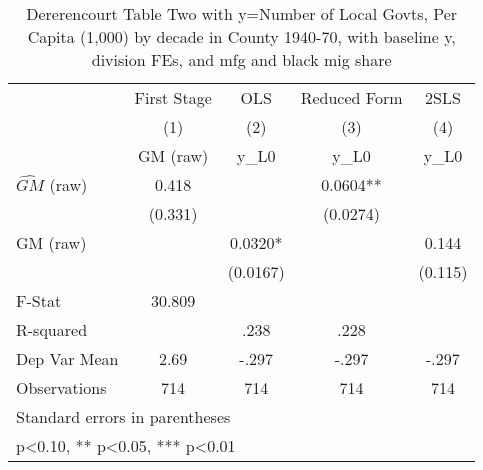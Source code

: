 \begin{table}[htbp]\centering
\def\sym#1{\ifmmode^{#1}\else\(^{#1}\)\fi}
\caption{Dererencourt Table Two with y=Number of Local Govts, Per Capita (1,000) by decade in County 1940-70, with baseline y, division FEs, and mfg and black mig share}
\begin{tabular}{l*{4}{c}}
\toprule
                    & First Stage   &         OLS   &Reduced Form   &        2SLS   \\
                    &\multicolumn{1}{c}{(1)}&\multicolumn{1}{c}{(2)}&\multicolumn{1}{c}{(3)}&\multicolumn{1}{c}{(4)}\\
                    &\multicolumn{1}{c}{GM  (raw)}&\multicolumn{1}{c}{y\_L0}&\multicolumn{1}{c}{y\_L0}&\multicolumn{1}{c}{y\_L0}\\
\midrule
$\hat{GM}$ (raw)    &       0.418   &               &      0.0604** &               \\
                    &     (0.331)   &               &    (0.0274)   &               \\
\addlinespace
GM  (raw)           &               &      0.0320*  &               &       0.144   \\
                    &               &    (0.0167)   &               &     (0.115)   \\
\midrule
F-Stat              &      30.809   &               &               &               \\
R-squared           &               &        .238   &        .228   &               \\
Dep Var Mean        &        2.69   &       -.297   &       -.297   &       -.297   \\
Observations        &         714   &         714   &         714   &         714   \\
\bottomrule
\multicolumn{5}{l}{\footnotesize Standard errors in parentheses}\\
\multicolumn{5}{l}{\footnotesize * p<0.10, ** p<0.05, *** p<0.01}\\
\end{tabular}
\end{table}
